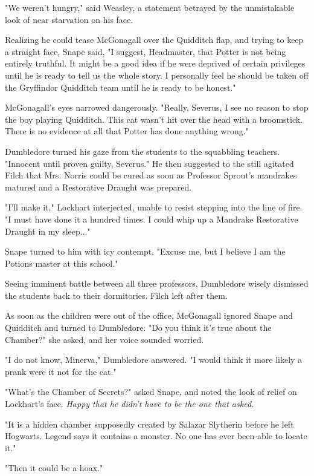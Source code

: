 \documentclass[a4paper,11pt]{article}
\begin{document}
"We weren't hungry," said Weasley, a statement betrayed by the unmistakable look of near starvation on his face.

Realizing he could tease McGonagall over the Quidditch flap, and trying to keep a straight face, Snape said, "I suggest, Headmaster, that Potter is not being entirely truthful. It might be a good idea if he were deprived of certain privileges until he is ready to tell us the whole story. I personally feel he should be taken off the Gryffindor Quidditch team until he is ready to be honest."

McGonagall's eyes narrowed dangerously. "Really, Severus, I see no reason to stop the boy playing Quidditch. This cat wasn't hit over the head with a broomstick. There is no evidence at all that Potter has done anything wrong."

Dumbledore turned his gaze from the students to the squabbling teachers. "Innocent until proven guilty, Severus." He then suggested to the still agitated Filch that Mrs. Norris could be cured as soon as Professor Sprout's mandrakes matured and a Restorative Draught was prepared.

"I'll make it," Lockhart interjected, unable to resist stepping into the line of fire. "I must have done it a hundred times. I could whip up a Mandrake Restorative Draught in my sleep..."

Snape turned to him with icy contempt. "Excuse me, but I believe I am the Potions master at this school."

Seeing imminent battle between all three professors, Dumbledore wisely dismissed the students back to their dormitories. Filch left after them.

As soon as the children were out of the office, McGonagall ignored Snape and Quidditch and turned to Dumbledore. "Do you think it's true about the Chamber?" she asked, and her voice sounded worried.

"I do not know, Minerva," Dumbledore answered. "I would think it more likely a prank were it not for the cat."

"What's the Chamber of Secrets?" asked Snape, and noted the look of relief on Lockhart's face. \emph{Happy that he didn't have to be the one that asked.}

"It is a hidden chamber supposedly created by Salazar Slytherin before he left Hogwarts. Legend says it contains a monster. No one has ever been able to locate it."

"Then it could be a hoax."
\end{document}
